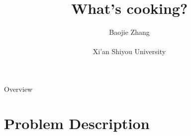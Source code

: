 \documentclass[
 size=14pt,
 paper=smartboard,  %
 mode=present, 		%
 display=slides, 	%
 style=tuliplab,  	%
 pauseslide,
 fleqn,leqno]{powerdot}
\title{What's cooking?}
\author{
Baojie  Zhang
\\
\\Xi'an Shiyou University
}
\date{\gitCommitterDate}
\begin{document}
\maketitle



\begin{slide}[toc=,bm=]{Overview}
\tableofcontents[content=currentsection,type=1]
\end{slide}


\section{Problem Description}
\end{document}
